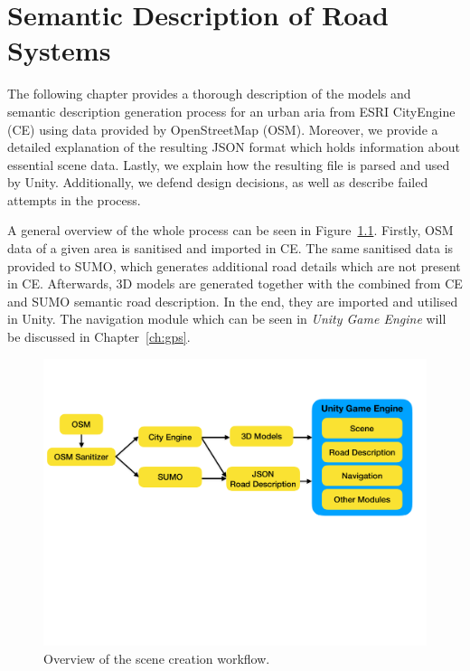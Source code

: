 \chapter{Semantic Description of Road Systems}
\label{ch:descriptionOfRoadSystems}
The following chapter provides a thorough description of the models and semantic description generation process for an urban aria from ESRI CityEngine (CE) using data provided by OpenStreetMap (OSM). Moreover, we provide a detailed explanation of the resulting JSON format which holds information about essential scene data. Lastly, we explain how the resulting file is parsed and used by Unity. Additionally, we defend design decisions, as well as describe failed attempts in the process.

A general overview of the whole process can be seen in Figure~\ref{fig:overview}. Firstly, OSM data of a given area is sanitised and imported in CE. The same sanitised data is provided to SUMO, which generates additional road details which are not present in CE. Afterwards, 3D models are generated together with the combined from CE and SUMO semantic road description. In the end, they are imported and utilised in Unity. The navigation module which can be seen in \emph{Unity Game Engine} will be discussed in Chapter~\ref{ch:gps}.

\begin{figure}[htb]
	\centering
	\includegraphics[width=0.95\linewidth]{figures/overview}
	\caption{Overview of the scene creation workflow.}
	\label{fig:overview}
\end{figure}

